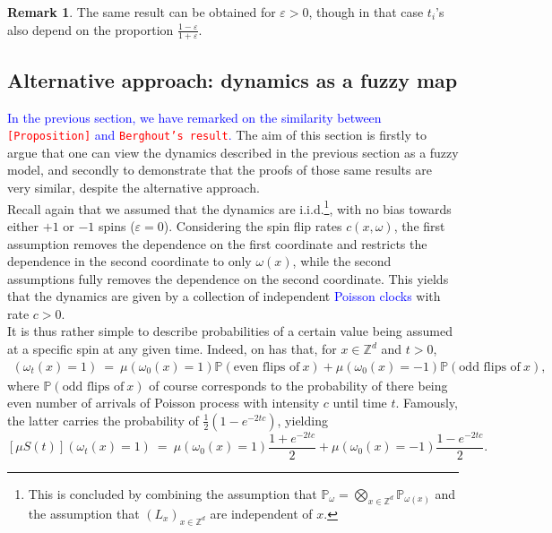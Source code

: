 \documentclass[12pt]{article}
\renewcommand{\P}{\mathbb{P}}
\newcommand{\Z}{\mathbb{Z}}
\newcommand{\1}{\mathbbm{1}}
\newcommand{\5}{\vspace{0.5cm}}
\theoremstyle{definition}
\newtheorem{rem}[thm]{Remark}
\begin{document}
\begin{rem}
The same result can be obtained for $\varepsilon>0$, though in that case $t_i$'s also depend on the proportion $\frac{1-\varepsilon}{1+\varepsilon}$.
\end{rem}


\subsection{Alternative approach: dynamics as a fuzzy map}

\textcolor{blue}{In the previous section, we have remarked on the similarity between \textcolor{red}{\texttt{[Proposition]}} and \textcolor{red}{\texttt{Berghout's result}}.} The aim of this section is firstly to argue that one can view the dynamics described in the previous section as a fuzzy model, and secondly to demonstrate that the proofs of those same results are very similar, despite the alternative approach. \\

Recall again that we assumed that the dynamics are i.i.d.\footnote{This is concluded by combining the assumption that $\P_\omega=\bigotimes_{x\in\Z^d}\P_{\omega(x)}$ and the assumption that $(L_x)_{x\in\Z^d}$ are independent of $x$.}, with no bias towards either $+1$ or $-1$ spins ($\varepsilon=0$). Considering the spin flip rates $c(x,\omega)$, the first assumption removes the dependence on the first coordinate and restricts the dependence in the second coordinate to only $\omega(x)$, while the second assumptions fully removes the dependence on the second coordinate. This yields that the dynamics are given by a collection of independent \textcolor{blue}{Poisson clocks} with rate $c>0$. \\

It is thus rather simple to describe probabilities of a certain value being assumed at a specific spin at any given time. Indeed, on has that, for $x\in\Z^d$ and $t>0$,
\begin{align*}
[\mu S(t)](\omega_t(x)=1) ~=~ \mu(\omega_0(x)=1)\P(\text{even flips of}~x) + \mu(\omega_0(x)=-1)\P(\text{odd flips of}~x),
\end{align*}
where $\P(\text{odd flips of}~x)$ of course corresponds to the probability of there being even number of arrivals of Poisson process with intensity $c$ until time $t$. Famously, the latter carries the probability of $\frac{1}{2}(1-e^{-2tc})$, yielding
$$[\mu S(t)](\omega_t(x)=1) ~=~ \mu(\omega_0(x)=1)\frac{1+e^{-2tc}}{2} + \mu(\omega_0(x)=-1)\frac{1-e^{-2tc}}{2}.$$
\end{document}
